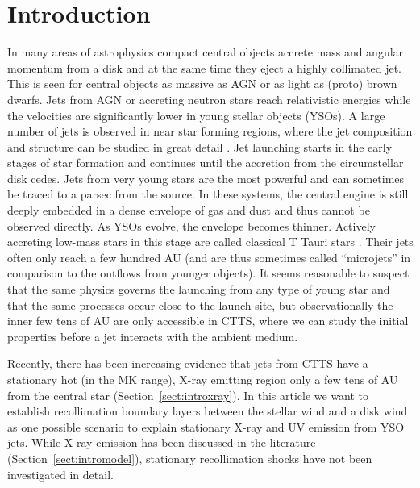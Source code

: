 \documentclass{emulateapj}
\begin{document}



\section{Introduction} 
In many areas of astrophysics compact central objects accrete mass and angular momentum from a disk and at the same time they eject a highly collimated jet. This is seen for central objects as massive as AGN or as light as (proto) brown dwarfs. Jets from AGN or accreting neutron stars reach relativistic energies while the velocities are significantly lower in young stellar objects (YSOs). 
A large number of jets is observed in near star forming regions, where the jet composition and structure can be studied in great detail \citep[see the review by][]{2014arXiv1402.3553F}.
Jet launching starts in the early stages of star formation and continues until the accretion from the circumstellar disk cedes. Jets from very young stars are the most powerful and can sometimes be traced to a parsec from the source. In these systems, the central engine is still deeply embedded in a dense envelope of gas and dust and thus cannot be observed directly. As YSOs evolve, the envelope becomes thinner. Actively accreting low-mass stars in this stage are called classical T Tauri stars \citep[for a review see][]{2013AN....334...67G}. Their jets often only reach a few hundred AU (and are thus sometimes called ``microjets'' in comparison to the outflows from younger objects).
It seems reasonable to suspect that the same physics governs the launching from any type of young star and that the same processes occur close to the launch site, but observationally the inner few tens of AU are only accessible in CTTS, where we can study the initial properties before a jet interacts with the ambient medium. 

Recently, there has been increasing evidence that jets from CTTS have a stationary hot (in the MK range), X-ray emitting region only a few tens of AU from the central star (Section~\ref{sect:introxray}). In this article we want to establish recollimation boundary layers between the stellar wind and a disk wind as one possible scenario to explain stationary X-ray and UV emission from YSO jets.
While X-ray emission has been discussed in the literature (Section~\ref{sect:intromodel}), stationary recollimation shocks have not been investigated in detail. 
\end{document}
